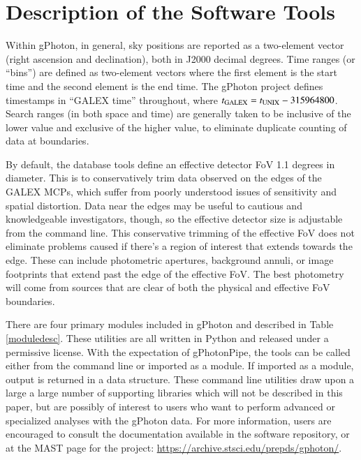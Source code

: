 \documentclass[5p]{elsarticle}
\begin{document}
\section{Description of the Software Tools}
\label{softwaretools}
Within gPhoton, in general, sky positions are reported as a two-element vector (right ascension and declination), both in J2000 decimal degrees. Time ranges (or ``bins'') are defined as two-element vectors where the first element is the start time and the second element is the end time. The gPhoton project defines timestamps in ``GALEX time'' throughout, where $t_{\rm{GALEX}} = t_{\rm{UNIX}} - 315964800$. Search ranges (in both space and time) are generally taken to be inclusive of the lower value and exclusive of the higher value, to eliminate duplicate counting of data at boundaries.

By default, the database tools define an effective detector FoV 1.1 degrees in diameter. This is to conservatively trim data observed on the edges of the GALEX MCPs, which suffer from poorly understood issues of sensitivity and spatial distortion. Data near the edges may be useful to cautious and knowledgeable investigators, though, so the effective detector size is adjustable from the command line. This conservative trimming of the effective FoV does not eliminate problems caused if there's a region of interest that extends towards the edge.  These can include photometric apertures, background annuli, or image footprints that extend past the edge of the effective FoV.  The best photometry will come from sources that are clear of both the physical and effective FoV boundaries.

There are four primary modules included in gPhoton and described in Table \ref{moduledesc}. These utilities are all written in Python and released under a permissive license. With the expectation of gPhotonPipe, the tools can be called either from the command line or imported as a module. If imported as a module, output is returned in a data structure. These command line utilities draw upon a large a large number of supporting libraries which will not be described in this paper, but are possibly of interest to users who want to perform advanced or specialized analyses with the gPhoton data.  For more information, users are encouraged to consult the documentation available in the software repository, or at the MAST page for the project: \url{https://archive.stsci.edu/prepds/gphoton/}.
\end{document}
